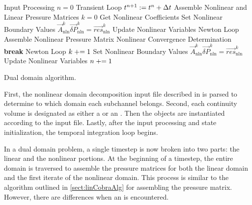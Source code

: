 \begin{algo}[ht!]
\setlength{\baselineskip}{0.625\baselineskip}
\begin{algorithmic}[1]
\Require Input Processing
\Set $n = 0$
\Loop \; Transient Loop
    \Set $t^{n+1} : = t^{n} + \dt{}$
	\Algorithm Assemble Nonlinear and Linear Pressure Matrices	 
	    \Set $k = 0$
		\Algorithm Get Nonlinear Coefficients 
		\Algorithm Set Nonlinear Boundary Values 
		\Solve $\vec{A}^{k}_{\text{nln}} \vec{\delta P}_{\text{nln}}^{k} = \vec{res}_{\text{nln}}^{k}$	
		\Algorithm Update Nonlinear Variables  
	    \Loop \; Newton Loop
			\Algorithm Assemble Nonlinear Pressure Matrix 
			\Algorithm Nonlinear Convergence Determination 
				\State \textbf{break} Newton Loop 
			\EndIf		
			\Set $k \mathrel{+}= 1$
			\Algorithm Set Nonlinear Boundary Values 
			\Solve $\vec{A}_{\text{nln}}^{k} \vec{\delta P}_{\text{nln}}^{k} = \vec{res}_{\text{nln}}^{k}$
			\Algorithm Update Nonlinear Variables 
		\EndLoop
	\EndIf
	 
	\Set $n \mathrel{+}= 1$
\EndLoop
\end{algorithmic}
\caption{Dual domain \cobra{} algorithm.}
\label{alg:domDecompAlgorithm}
\end{algo}

First, the nonlinear domain decomposition input file described in  is parsed to determine to which domain each subchannel belongs.
Second, each continuity volume is designated as either a  or an .
Then the  objects are instantiated according to the \cobra{} input file.
Lastly, after the input processing and state initialization, the temporal integration loop begins.

In a dual domain problem, a single timestep is now broken into two parts: the linear and the nonlinear portions.
At the beginning of a timestep, the entire domain is traversed to assemble the pressure matrices for both the linear domain and the first iterate of the nonlinear domain.
This process is similar to the algorithm outlined in \ref{sect:linCobraAlg} for assembling the pressure matrix.
However, there are differences when an  is encountered.

